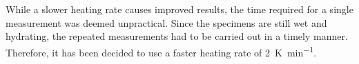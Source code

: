 
While a slower heating rate causes improved results, the time required for a single measurement was deemed unpractical.
Since the specimens are still wet and hydrating, the repeated measurements had to be carried out in a timely manner.
Therefore, it has been decided to use a faster heating rate of \qty{2}{\kelvin\per\minute}. %

